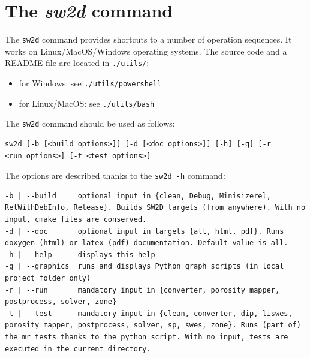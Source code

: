 \section{The \textit{sw2d} command}\label{sec:sw2d-command}
%
The \texttt{sw2d} command provides shortcuts to a number of operation sequences. It works on Linux/Mac\-OS/Windows operating systems. 
The source code and a README file are located in \texttt{./utils/}:
\begin{itemize}
  \item for Windows: see \texttt{./utils/powershell}
  \item for Linux/MacOS: see \texttt{./utils/bash}
\end{itemize}

The \texttt{sw2d} command should be used as follows:
\begin{lstlisting}[basicstyle=\tiny]
sw2d [-b [<build_options>]] [-d [<doc_options>]] [-h] [-g] [-r <run_options>] [-t <test_options>]
\end{lstlisting}

The options are described thanks to the \texttt{sw2d -h} command:
\begin{lstlisting}[basicstyle=\tiny]
-b | --build     optional input in {clean, Debug, Minisizerel, RelWithDebInfo, Release}. Builds SW2D targets (from anywhere). With no input, cmake files are conserved.
-d | --doc       optional input in targets {all, html, pdf}. Runs doxygen (html) or latex (pdf) documentation. Default value is all.
-h | --help      displays this help
-g | --graphics  runs and displays Python graph scripts (in local project folder only)
-r | --run       mandatory input in {converter, porosity_mapper, postprocess, solver, zone}
-t | --test      mandatory input in {clean, converter, dip, liswes, porosity_mapper, postprocess, solver, sp, swes, zone}. Runs (part of) the mr_tests thanks to the python script. With no input, tests are executed in the current directory.
\end{lstlisting}


